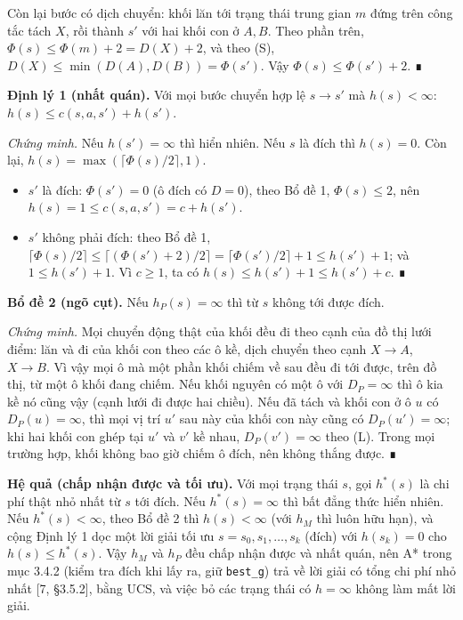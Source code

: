 Còn lại bước có dịch chuyển: khối lăn tới trạng thái trung gian \(m\) đứng trên công tắc tách \(X\), rồi thành \(s'\) với hai khối con ở \(A, B\). Theo phần trên, \(\Phi(s) \le \Phi(m) + 2 = D(X) + 2\), và theo (S), \(D(X) \le \min(D(A), D(B)) = \Phi(s')\). Vậy \(\Phi(s) \le \Phi(s') + 2\). ∎

\textbf{Định lý 1 (nhất quán).} Với mọi bước chuyển hợp lệ \(s \to s'\) mà \(h(s) < \infty\): \(h(s) \le c(s, a, s') + h(s')\).

\emph{Chứng minh.} Nếu \(h(s') = \infty\) thì hiển nhiên. Nếu \(s\) là đích thì \(h(s) = 0\). Còn lại, \(h(s) = \max(\lceil \Phi(s)/2 \rceil, 1)\).

\begin{itemize}
\tightlist
\item
  \(s'\) là đích: \(\Phi(s') = 0\) (ô đích có \(D = 0\)), theo Bổ đề 1, \(\Phi(s) \le 2\), nên \(h(s) = 1 \le c(s, a, s') = c + h(s')\).
\item
  \(s'\) không phải đích: theo Bổ đề 1, \(\lceil \Phi(s)/2 \rceil \le \lceil (\Phi(s') + 2)/2 \rceil = \lceil \Phi(s')/2 \rceil + 1 \le h(s') + 1\); và \(1 \le h(s') + 1\). Vì \(c \ge 1\), ta có \(h(s) \le h(s') + 1 \le h(s') + c\). ∎
\end{itemize}

\textbf{Bổ đề 2 (ngõ cụt).} Nếu \(h_P(s) = \infty\) thì từ \(s\) không tới được đích.

\emph{Chứng minh.} Mọi chuyển động thật của khối đều đi theo cạnh của đồ thị lưới điểm: lăn và đi của khối con theo các ô kề, dịch chuyển theo cạnh \(X \to A\), \(X \to B\). Vì vậy mọi ô mà một phần khối chiếm về sau đều đi tới được, trên đồ thị, từ một ô khối đang chiếm. Nếu khối nguyên có một ô với \(D_P = \infty\) thì ô kia kề nó cũng vậy (cạnh lưới đi được hai chiều). Nếu đã tách và khối con ở ô \(u\) có \(D_P(u) = \infty\), thì mọi vị trí \(u'\) sau này của khối con này cũng có \(D_P(u') = \infty\); khi hai khối con ghép tại \(u'\) và \(v'\) kề nhau, \(D_P(v') = \infty\) theo (L). Trong mọi trường hợp, khối không bao giờ chiếm ô đích, nên không thắng được. ∎

\textbf{Hệ quả (chấp nhận được và tối ưu).} Với mọi trạng thái \(s\), gọi \(h^*(s)\) là chi phí thật nhỏ nhất từ \(s\) tới đích. Nếu \(h^*(s) = \infty\) thì bất đẳng thức hiển nhiên. Nếu \(h^*(s) < \infty\), theo Bổ đề 2 thì \(h(s) < \infty\) (với \(h_M\) thì luôn hữu hạn), và cộng Định lý 1 dọc một lời giải tối ưu \(s = s_0, s_1, \dots, s_k\) (đích) với \(h(s_k) = 0\) cho \(h(s) \le h^*(s)\). Vậy \(h_M\) và \(h_P\) đều chấp nhận được và nhất quán, nên A* trong mục 3.4.2 (kiểm tra đích khi lấy ra, giữ \texttt{best\_\allowbreak{}g}) trả về lời giải có tổng chi phí nhỏ nhất {[}7, §3.5.2{]}, bằng UCS, và việc bỏ các trạng thái có \(h = \infty\) không làm mất lời giải.

